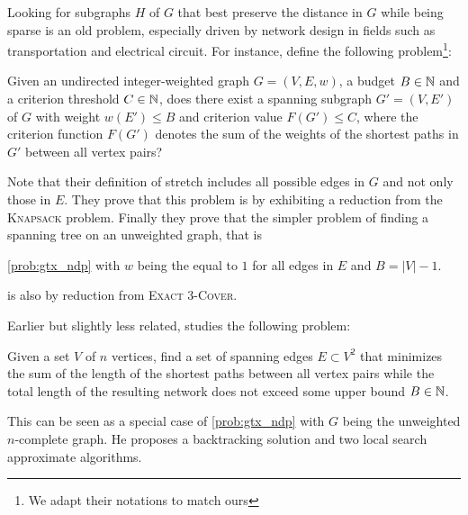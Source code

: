 Looking for subgraphs $H$ of $G$ that best preserve the distance in $G$ while being sparse is an old
problem, especially driven by network design in fields such as transportation and electrical
circuit. For instance, \textcite{Johnson1978} define the following problem\footnote{We adapt their
notations to match ours}:  
\begin{problem}
  \label{prob:gtx_ndp}
  Given an undirected integer-weighted graph $G=(V, E, w)$, a budget $B\in\mathbb{N}$ and a criterion
  threshold $C\in \mathbb{N}$, does there exist a spanning subgraph $G'=(V, E')$ of $G$ with weight
  $w(E') \leq B$ and criterion value $F(G') \leq C$, where the criterion function $F(G')$ denotes
  the sum of the weights of the shortest paths in $G'$ between all vertex pairs?
\end{problem}
Note that their definition of stretch includes all possible edges in $G$ and not only those in $E$.
They prove that this problem is \NPc{} by exhibiting a reduction from the \textsc{Knapsack}
problem. Finally they prove that the simpler problem of finding a spanning tree on an unweighted
graph, that is
\begin{problem}
  \autoref{prob:gtx_ndp} with $w$ being the equal to $1$ for all edges in $E$ and $B=|V|-1$.
\end{problem}
is also \NPc{} by reduction from \textsc{Exact 3-Cover}.

Earlier but slightly less related, \textcite{OptimalNetwork69} studies the following problem:
\begin{problem}
  \label{prob:gtx_scott}
  Given a set $V$ of $n$ vertices, find a set of spanning edges $E\subset V^2$ that minimizes
  the sum of the length of the shortest paths  between all vertex pairs while the
  total length of the resulting network does not exceed some upper bound $B\in\mathbb{N}$.
\end{problem}
This can be seen as a special case of \autoref{prob:gtx_ndp} with $G$ being the
unweighted $n$-complete graph. He proposes a backtracking solution and two local search approximate
algorithms.

